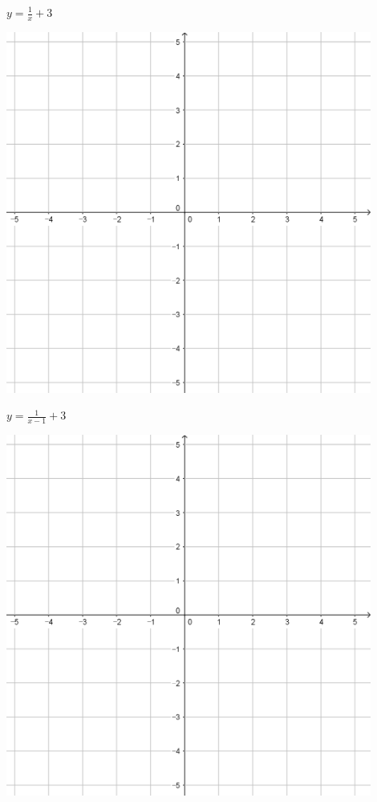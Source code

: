 \documentclass[a4paper]{oblivoir}
\begin{document}
\begin{minipage}{0.45\textwidth}\centering
\(y=\frac1x+3\)
\par\bigskip\includegraphics[width=0.9\textwidth]{55}
\end{minipage}
\begin{minipage}{0.45\textwidth}\centering
\(y=\frac1{x-1}+3\)
\par\bigskip\includegraphics[width=0.9\textwidth]{55}
\end{minipage}\bigskip\bigskip\par
\end{document}
